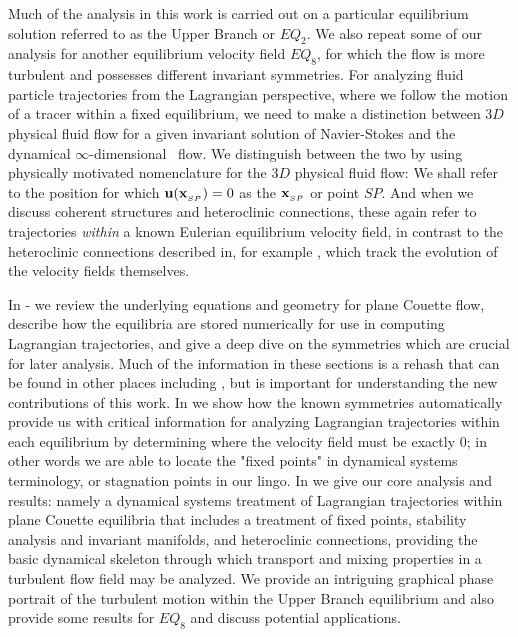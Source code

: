 \documentclass[letter,12pt,openany]{article}
\begin{document}
Much of the analysis in this work is carried out on a particular equilibrium solution referred to as the Upper Branch or $EQ_2$.
    We also repeat some of our analysis  for another equilibrium velocity field $EQ_8$, for which the flow is more turbulent
    and possesses different invariant symmetries.
For analyzing fluid particle trajectories from the Lagrangian perspective, where we follow the motion of a tracer within a fixed equilibrium,  we need to make a distinction between
$3D$ physical fluid flow for a given invariant solution of Navier-Stokes
and the dynamical $\infty$-dimensional \statesp\ flow. We distinguish between the two by using physically motivated nomenclature
for the $3D$ physical fluid flow: We shall refer to the position
 for which
${\bf u}({\bf x}_{_{SP}})=0$
as the {\em \stagp} ${\bf x}_{_{SP}}$ or point $SP$. And when we discuss 
coherent structures and heteroclinic connections, these again refer to 
trajectories \textit{within} a known Eulerian equilibrium velocity field, 
in contrast to the heteroclinic connections described in, for example 
\cite{GHCV08}, which track the evolution of the velocity fields 
themselves. 

 In - we review the underlying equations and geometry for plane Couette flow, describe how the equilibria are stored numerically for use in computing Lagrangian trajectories, and give a deep dive on the symmetries which are crucial for later analysis. Much of the information in these sections is a rehash that can be found in other places including \cite{GHCW07}, but is important for understanding the new contributions of this work.  In  we show how the known symmetries automatically provide us with critical information for analyzing Lagrangian trajectories within each equilibrium by determining where the velocity field must be exactly 0; in other words we are able to locate the "fixed points" in dynamical systems terminology, or stagnation points in our lingo. In  we give our core analysis and results: namely a dynamical systems treatment of Lagrangian trajectories within plane Couette equilibria that includes a treatment of fixed points, stability analysis and invariant manifolds, and heteroclinic connections, providing the basic dynamical skeleton through which transport and mixing properties in a turbulent flow field may be analyzed. We provide an intriguing graphical phase portrait of the turbulent motion within the Upper Branch equilibrium and also provide some results for $EQ_8$ and discuss potential applications.
\end{document}
